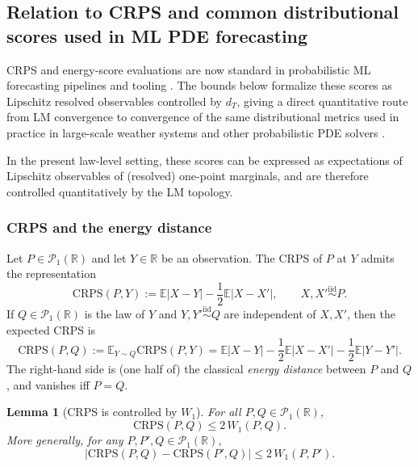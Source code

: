 \documentclass{article}
\numberwithin{equation}{section}
\theoremstyle{plain}
\newtheorem{lemma}[theorem]{Lemma}
\theoremstyle{definition}
\theoremstyle{remark}
\newcommand{\R}{\mathbb{R}}
\newcommand{\E}{\mathbb{E}}
\newcommand{\Pcal}{\mathcal{P}}
\begin{document}
\subsection{Relation to CRPS and common distributional scores used in ML PDE forecasting}
\label{subsec:crps}

CRPS and energy-score evaluations are now standard in probabilistic ML forecasting pipelines and tooling
\cite{lang2026aifs,bulte2025probabilistic,mahesh2024huge,mahesh2024huge2}.
The bounds below formalize these scores as Lipschitz resolved observables controlled by $d_T$, giving a direct quantitative
route from LM convergence to convergence of the same distributional metrics used in practice in large-scale weather systems
and other probabilistic PDE solvers \cite{price2023gencast,price2025probabilistic,larsson2025diffusion,andrae2024continuous}.

In the present law-level setting, these scores can be expressed as expectations of Lipschitz observables of (resolved)
one-point marginals, and are therefore controlled quantitatively by the LM topology.

\subsubsection{CRPS and the energy distance}

Let $P\in\Pcal_1(\R)$ and let $Y\in\R$ be an observation. The CRPS of $P$ at $Y$ admits the representation
\begin{equation}\label{eq:crps-point}
\mathrm{CRPS}(P,Y)
:= \E|X-Y|-\frac12\E|X-X'|,
\qquad X,X'\stackrel{\mathrm{iid}}{\sim}P.
\end{equation}
If $Q\in\Pcal_1(\R)$ is the law of $Y$ and $Y,Y'\stackrel{\mathrm{iid}}{\sim}Q$ are independent of $X,X'$, then the expected CRPS is
\begin{equation}\label{eq:crps-law}
\mathrm{CRPS}(P,Q)
:= \E_{Y\sim Q}\mathrm{CRPS}(P,Y)
= \E|X-Y|-\frac12\E|X-X'|-\frac12\E|Y-Y'|.
\end{equation}
The right-hand side is (one half of) the classical \emph{energy distance} between $P$ and $Q$, and vanishes iff $P=Q$.

\begin{lemma}[CRPS is controlled by $W_1$]\label{lem:crps-w1}
For all $P,Q\in\Pcal_1(\R)$,
\begin{equation}\label{eq:crps-w1}
\mathrm{CRPS}(P,Q)\le 2\,W_1(P,Q).
\end{equation}
More generally, for any $P,P',Q\in\Pcal_1(\R)$,
\begin{equation}\label{eq:crps-lip}
\big|\mathrm{CRPS}(P,Q)-\mathrm{CRPS}(P',Q)\big|\le 2\,W_1(P,P').
\end{equation}
\end{lemma}
\end{document}
